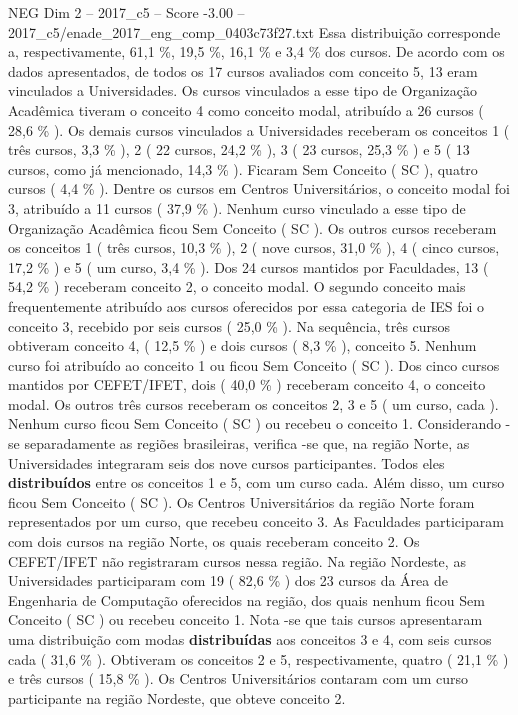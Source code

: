 \begin{textsample}{NEG Dim 2 – 2017\_c5 – Score -3.00 – 2017\_c5/enade\_2017\_eng\_comp\_0403c73f27.txt}
Essa distribuição corresponde a, respectivamente, 61,1 \%, 19,5 \%, 16,1 \% e 3,4 \% dos cursos.
De acordo com os dados apresentados, de todos os 17 cursos avaliados com conceito 5, 13 eram vinculados a Universidades.
Os cursos vinculados a esse tipo de Organização Acadêmica tiveram o conceito 4 como conceito modal, atribuído a 26 cursos ( 28,6 \% ).
Os demais cursos vinculados a Universidades receberam os conceitos 1 ( três cursos, 3,3 \% ), 2 ( 22 cursos, 24,2 \% ), 3 ( 23 cursos, 25,3 \% ) e 5 ( 13 cursos, como já mencionado, 14,3 \% ).
Ficaram Sem Conceito ( SC ), quatro cursos ( 4,4 \% ).
Dentre os cursos em Centros Universitários, o conceito modal foi 3, atribuído a 11 cursos ( 37,9 \% ).
Nenhum curso vinculado a esse tipo de Organização Acadêmica ficou Sem Conceito ( SC ).
Os outros cursos receberam os conceitos 1 ( três cursos, 10,3 \% ), 2 ( nove cursos, 31,0 \% ), 4 ( cinco cursos, 17,2 \% ) e 5 ( um curso, 3,4 \% ).
Dos 24 cursos mantidos por Faculdades, 13 ( 54,2 \% ) receberam conceito 2, o conceito modal.
O segundo conceito mais frequentemente atribuído aos cursos oferecidos por essa categoria de IES foi o conceito 3, recebido por seis cursos ( 25,0 \% ).
Na sequência, três cursos obtiveram conceito 4, ( 12,5 \% ) e dois cursos ( 8,3 \% ), conceito 5.
Nenhum curso foi atribuído ao conceito 1 ou ficou Sem Conceito ( SC ).
Dos cinco cursos mantidos por CEFET/IFET, dois ( 40,0 \% ) receberam conceito 4, o conceito modal.
Os outros três cursos receberam os conceitos 2, 3 e 5 ( um curso, cada ).
Nenhum curso ficou Sem Conceito ( SC ) ou recebeu o conceito 1.
Considerando -se separadamente as regiões brasileiras, verifica -se que, na região Norte, as Universidades integraram seis dos nove cursos participantes.
Todos eles \textbf{distribuídos} entre os conceitos 1 e 5, com um curso cada.
Além disso, um curso ficou Sem Conceito ( SC ).
Os Centros Universitários da região Norte foram representados por um curso, que recebeu conceito 3.
As Faculdades participaram com dois cursos na região Norte, os quais receberam conceito 2.
Os CEFET/IFET não registraram cursos nessa região.
Na região Nordeste, as Universidades participaram com 19 ( 82,6 \% ) dos 23 cursos da Área de Engenharia de Computação oferecidos na região, dos quais nenhum ficou Sem Conceito ( SC ) ou recebeu conceito 1.
Nota -se que tais cursos apresentaram uma distribuição com modas \textbf{distribuídas} aos conceitos 3 e 4, com seis cursos cada ( 31,6 \% ).
Obtiveram os conceitos 2 e 5, respectivamente, quatro ( 21,1 \% ) e três cursos ( 15,8 \% ).
Os Centros Universitários contaram com um curso participante na região Nordeste, que obteve conceito 2.

\end{textsample}
